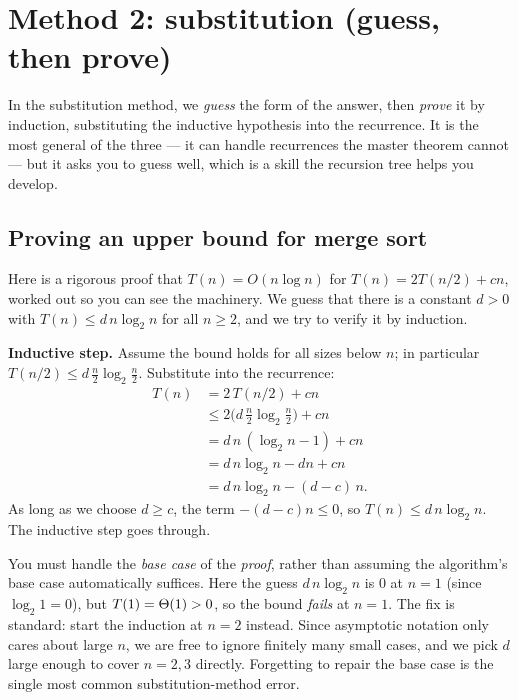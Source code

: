 \section{Method 2: substitution (guess, then prove)}

In the substitution method, we \emph{guess} the form of
the answer, then \emph{prove} it by induction, substituting the inductive
hypothesis into the recurrence. It is the most general of the three --- it can handle
recurrences the master theorem cannot --- but it asks you to guess well, which is
a skill the recursion tree helps you develop.

\subsection{Proving an upper bound for merge sort}

Here is a rigorous proof that $T(n) = O(n \log n)$ for $T(n) = 2T(n/2) + cn$,
worked out so you can see the machinery. We guess that there is a constant $d>0$ with $T(n) \le d\,n\log_2 n$ for
all $n \ge 2$, and we try to verify it by induction.

\begin{formalbox}
\textbf{Inductive step.} Assume the bound holds for all sizes below $n$; in
particular $T(n/2) \le d\,\tfrac{n}{2}\log_2\tfrac{n}{2}$. Substitute into the
recurrence:
\begin{align*}
T(n) &= 2\,T(n/2) + cn \\
     &\le 2\Big(d\,\tfrac{n}{2}\log_2\tfrac{n}{2}\Big) + cn \\
     &= d\,n\,(\log_2 n - 1) + cn \\
     &= d\,n\log_2 n - dn + cn \\
     &= d\,n\log_2 n - (d-c)\,n.
\end{align*}
As long as we choose $d \ge c$, the term $-(d-c)n \le 0$, so
$T(n) \le d\,n\log_2 n$. The inductive step goes through.
\end{formalbox}

\begin{trapbox}
You must handle the \emph{base case} of the \emph{proof}, rather than assuming the
algorithm's base case automatically suffices. Here the guess $d\,n\log_2 n$ is $0$ at
$n=1$ (since $\log_2 1 = 0$), but $T(1)=\Theta(1)>0$, so the bound \emph{fails} at
$n=1$. The fix is standard: start the induction at $n=2$ instead. Since asymptotic
notation only cares about large $n$, we are free to ignore finitely many small cases,
and we pick $d$ large enough to cover $n=2,3$ directly. Forgetting to repair the base
case is the single most common substitution-method error.
\end{trapbox}

